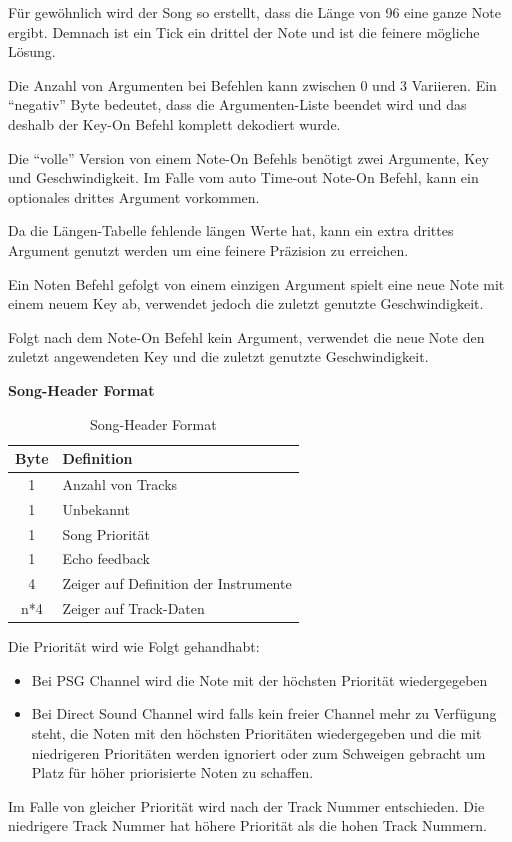 \documentclass[11pt,a4paper]{scrartcl}
\newcommand{\paratitle}[1] {
    \vspace{5mm}
    \large \textbf{#1} \normalsize
    \vspace{2mm}\newline
}
\begin{document}
F\"ur gew\"ohnlich wird der Song so erstellt, dass die L\"ange von 96 eine ganze Note ergibt. Demnach ist ein Tick ein drittel der Note und ist die feinere m\"ogliche L\"osung.

Die Anzahl von Argumenten bei Befehlen kann zwischen 0 und 3 Variieren. Ein \enquote{negativ} Byte bedeutet, dass die Argumenten-Liste beendet wird und das deshalb der Key-On Befehl komplett dekodiert wurde.

Die \enquote{volle} Version von einem Note-On Befehls ben\"otigt zwei Argumente, Key und Geschwindigkeit. Im Falle vom auto Time-out Note-On Befehl, kann ein optionales drittes Argument vorkommen. 

Da die L\"angen-Tabelle fehlende l\"angen Werte hat, kann ein extra drittes Argument genutzt werden um eine feinere Pr\"azision zu erreichen. 

Ein Noten Befehl gefolgt von einem einzigen Argument spielt eine neue Note mit einem neuem Key ab, verwendet jedoch die zuletzt genutzte Geschwindigkeit.

Folgt nach dem Note-On Befehl kein Argument, verwendet die neue Note den zuletzt angewendeten Key und die zuletzt genutzte Geschwindigkeit.


\paratitle{Song-Header Format}
\begin{table}[h]
    \centering
    \begin{tabular}{ c | p{8cm} }
        \textbf{Byte} & \textbf{Definition}\\
        \hline
        1 & Anzahl von Tracks\\
        \hline
        1 & Unbekannt\\
        \hline
        1 & Song Priorit\"at\\
				\hline
        1 & Echo feedback\\
				\hline
        4 & Zeiger auf Definition der Instrumente\\
				\hline
        n*4 & Zeiger auf Track-Daten\\
    \end{tabular}
    \caption{Song-Header Format}
    \label{table:HeaderFormat}
\end{table}

Die Priorit\"at wird wie Folgt gehandhabt:
\begin{itemize}
\item Bei PSG Channel wird die Note mit der h\"ochsten Priorit\"at wiedergegeben
\item Bei Direct Sound Channel wird falls kein freier Channel mehr zu Verf\"ugung steht, die Noten mit den h\"ochsten Priorit\"aten wiedergegeben und die mit niedrigeren Priorit\"aten werden ignoriert oder zum Schweigen gebracht um Platz f\"ur h\"oher priorisierte Noten zu schaffen.
\end{itemize}
Im Falle von gleicher Priorit\"at wird nach der Track Nummer entschieden. Die niedrigere Track Nummer hat h\"ohere Priorit\"at als die hohen Track Nummern.
\end{document}
